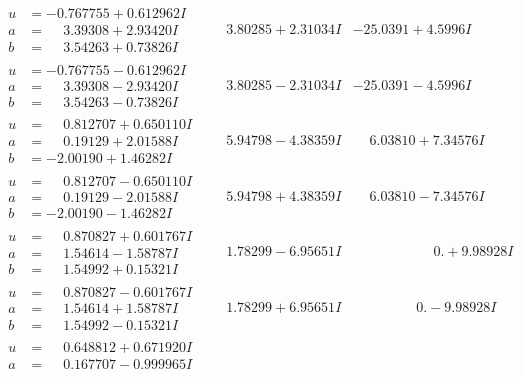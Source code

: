 \documentclass[1p]{elsarticle_modified}
\theoremstyle{definition}
\begin{document}
$$\begin{array}{c|c|c}
\begin{aligned}
u &= -0.767755 + 0.612962 I \\
a &= \phantom{-}3.39308 + 2.93420 I \\
b &= \phantom{-}3.54263 + 0.73826 I\end{aligned}
 & \phantom{-}3.80285 + 2.31034 I & -25.0391 + 4.5996 I \\ \hline\begin{aligned}
u &= -0.767755 - 0.612962 I \\
a &= \phantom{-}3.39308 - 2.93420 I \\
b &= \phantom{-}3.54263 - 0.73826 I\end{aligned}
 & \phantom{-}3.80285 - 2.31034 I & -25.0391 - 4.5996 I \\ \hline\begin{aligned}
u &= \phantom{-}0.812707 + 0.650110 I \\
a &= \phantom{-}0.19129 + 2.01588 I \\
b &= -2.00190 + 1.46282 I\end{aligned}
 & \phantom{-}5.94798 - 4.38359 I & \phantom{-}6.03810 + 7.34576 I \\ \hline\begin{aligned}
u &= \phantom{-}0.812707 - 0.650110 I \\
a &= \phantom{-}0.19129 - 2.01588 I \\
b &= -2.00190 - 1.46282 I\end{aligned}
 & \phantom{-}5.94798 + 4.38359 I & \phantom{-}6.03810 - 7.34576 I \\ \hline\begin{aligned}
u &= \phantom{-}0.870827 + 0.601767 I \\
a &= \phantom{-}1.54614 - 1.58787 I \\
b &= \phantom{-}1.54992 + 0.15321 I\end{aligned}
 & \phantom{-}1.78299 - 6.95651 I & \phantom{-0.000000 -}0. + 9.98928 I \\ \hline\begin{aligned}
u &= \phantom{-}0.870827 - 0.601767 I \\
a &= \phantom{-}1.54614 + 1.58787 I \\
b &= \phantom{-}1.54992 - 0.15321 I\end{aligned}
 & \phantom{-}1.78299 + 6.95651 I & \phantom{-0.000000 } 0. - 9.98928 I \\ \hline\begin{aligned}
u &= \phantom{-}0.648812 + 0.671920 I \\
a &= \phantom{-}0.167707 - 0.999965 I \\

\end{aligned}
\end{array}$$
\end{document}
